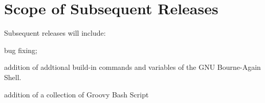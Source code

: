 \section{Scope of Subsequent Releases}

Subsequent releases will include:
\begin{asparaitem}
\item bug fixing;
\item addition of addtional build-in commands and variables of the GNU Bourne-Again Shell.
\item addition of a collection of Groovy Bash Script 
\end{asparaitem}



